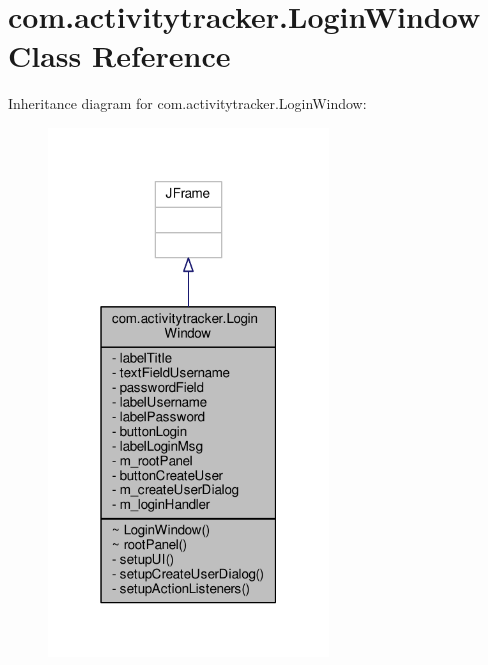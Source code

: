 \hypertarget{classcom_1_1activitytracker_1_1_login_window}{}\section{com.\+activitytracker.\+Login\+Window Class Reference}
\label{classcom_1_1activitytracker_1_1_login_window}


Inheritance diagram for com.\+activitytracker.\+Login\+Window\+:
\nopagebreak
\begin{figure}[H]
\begin{center}
\leavevmode
\includegraphics[width=211pt]{classcom_1_1activitytracker_1_1_login_window__inherit__graph}
\end{center}
\end{figure}


